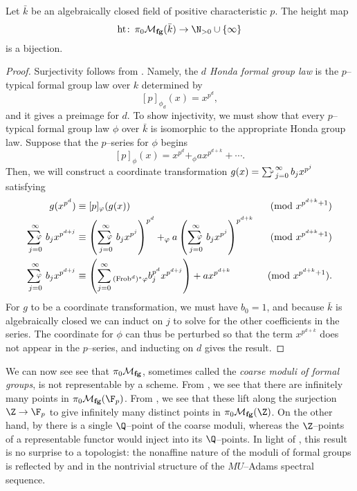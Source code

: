 \begin{theorem}\label{FGpsOverAlgClosedFields}
Let \(\bar k\) be an algebraically closed field of positive characteristic \(p\).  The height map \[\height\co \pi_0 \moduli{fg}(\bar k) \to \N_{> 0} \cup \{\infty\}\] is a bijection.
\end{theorem}
\begin{proof}
Surjectivity follows from .  Namely, the \textit{\(d\){\th} Honda formal group law} is the \(p\)--typical formal group law over \(k\) determined by \[[p]_{\phi_d}(x) = x^{p^d},\] and it gives a preimage for \(d\).  To show injectivity, we must show that every \(p\)--typical formal group law \(\phi\) over \(\bar k\) is isomorphic to the appropriate Honda group law.  Suppose that the \(p\)--series for \(\phi\) begins \[[p]_\phi(x) = x^{p^d} +_\phi a x^{p^{d+k}} + \cdots.\]  Then, we will construct a coordinate transformation \(g(x) = \sumphi_{j=0}^\infty b_j x^{p^j}\) satisfying
\begin{align*}
g(x^{p^d}) & \equiv [p]_\phi(g(x)) & \pmod{x^{p^{d+k} + 1}} \\
\sumphi_{j=0}^\infty b_j x^{p^{d+j}} & \equiv \left( \sumphi_{j=0}^\infty b_j x^{p^j} \right)^{p^d} +_\phi a \left( \sumphi_{j=0}^\infty b_j x^{p^j} \right)^{p^{d+k}} & \pmod{x^{p^{d+k} + 1}} \\
\sumphi_{j=0}^\infty b_j x^{p^{d+j}} & \equiv \left( \sum_{j=0}^\infty {}_{(\operatorname{Frob}^d)^* \phi} b_j^{p^d} x^{p^{d+j}} \right) + a x^{p^{d+k}} & \pmod{x^{p^{d+k} + 1}}.
\end{align*}
For \(g\) to be a coordinate transformation, we must have \(b_0 = 1\), and because \(\bar k\) is algebraically closed we can induct on \(j\) to solve for the other coefficients in the series.  The coordinate for \(\phi\) can thus be perturbed so that the term \(x^{p^{d+k}}\) does not appear in the \(p\)--series, and inducting on \(d\) gives the result.
\end{proof}

\begin{remark}
We can now see see that \(\pi_0 \mathcal{M}_{\mathbf{fg}}\), sometimes called the \textit{coarse moduli of formal groups}, is not representable by a scheme.  From , we see that there are infinitely many points in \(\pi_0 \moduli{fg}(\F_p)\).  From , we see that these lift along the surjection \(\Z \to \F_p\) to give infinitely many distinct points in \(\pi_0 \moduli{fg}(\Z)\).  On the other hand, by  there is a single \(\Q\)--point of the coarse moduli, whereas the \(\Z\)--points of a representable functor would inject into its \(\Q\)--points.  In light of , this result is no surprise to a topologist: the nonaffine nature of the moduli of formal groups is reflected by  and  in the nontrivial structure of the \(MU\)--Adams spectral sequence.
\end{remark}

